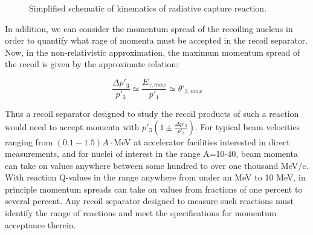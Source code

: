 \begin{figure}
\caption{Simplified schematic of kinematics of radiative capture reaction.}
\label{fig:kinematics}       %
\end{figure}

In addition, we can consider the momentum spread of the recoiling nucleus in order to quantify what rage of momenta must be accepted in the recoil separator. Now, in the non-relativistic approximation, the maximum momentum spread of the recoil is given by the approximate relation:

\begin{equation}
\frac{\Delta p'_{3}}{p'_{3}}\simeq\frac{E_{\gamma,max}}{p'_{1}}\simeq\theta'_{3,max}
\end{equation} 

Thus a recoil separator designed to study the recoil products of such a reaction would need to accept momenta with $p'_{3}(1\pm\frac{\Delta p'_{3}}{p'_{3}})$. For typical beam velocities ranging from $(0.1-1.5)A\cdot$MeV at accelerator facilities interested in direct measurements, and for nuclei of interest in the range A=10-40, beam momenta can take on values anywhere between some hundred to over one thousand MeV/c. With reaction Q-values in the range anywhere from under an MeV to 10 MeV, in principle momentum spreads can take on values from fractions of one percent to several percent. Any recoil separator designed to measure such reactions must identify the range of reactions and meet the specifications for momentum acceptance therein.  

